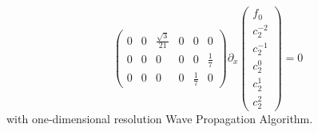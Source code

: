 \begin{frame}
\begin{enumerate}
$${\begin{pmatrix}
			0 & 0 & \frac{\sqrt{3}}{21} & 0 & 0 & 0 \\
			0 & 0 & 0 & 0 & 0 & \frac{1}{7}\\
			0 & 0 & 0 & 0 & \frac{1}{7} & 0
		\end{pmatrix}} \partial_x \left(\begin{array}{c}
			f_0 \\
			c_2^{-2} \\
			c_2^{-1} \\
			c_2^0 \\
			c_2^1 \\
			c_2^2
		\end{array}\right) = 0
		$$
		with one-dimensional resolution Wave Propagation Algorithm.
	\end{enumerate}
\end{frame}

